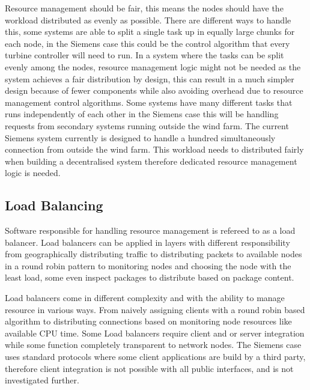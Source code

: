 Resource management should be fair, this means the nodes should have the workload distributed as evenly as possible.
There are different ways to handle this, some systems are able to split a single task up in equally large chunks for each node, in the Siemens case this could be the control algorithm that every turbine controller will need to run.
In a system where the tasks can be split evenly among the nodes, resource management logic might not be needed as the system achieves a fair distribution by design, this can result in a much simpler design because of fewer components while also avoiding overhead due to resource management control algorithms.
Some systems have many different tasks that runs independently of each other in the Siemens case this will be handling requests from secondary systems running outside the wind farm.
The current Siemens system currently is designed to handle a hundred simultaneously connection from outside the wind farm. This workload needs to distributed fairly when building a decentralised system therefore dedicated resource management logic is needed.

\subsection{Load Balancing}
Software responsible for handling resource management is refereed to as a load balancer.
Load balancers can be applied in layers with different responsibility from geographically distributing traffic  to distributing packets to available nodes in a round robin pattern to monitoring nodes and choosing the node with the least load, some even inspect packages to distribute based on package content.

Load balancers come in different complexity and with the ability to manage resource in various ways.
From naively assigning clients with a round robin based algorithm to distributing connections based on monitoring node resources like available CPU time. 
Some Load balancers require client and or server integration  while some function completely transparent to network nodes. 
The Siemens case uses standard protocols where some client applications are build by a third party,
therefore client integration is not possible with all public interfaces, and is not investigated further.

